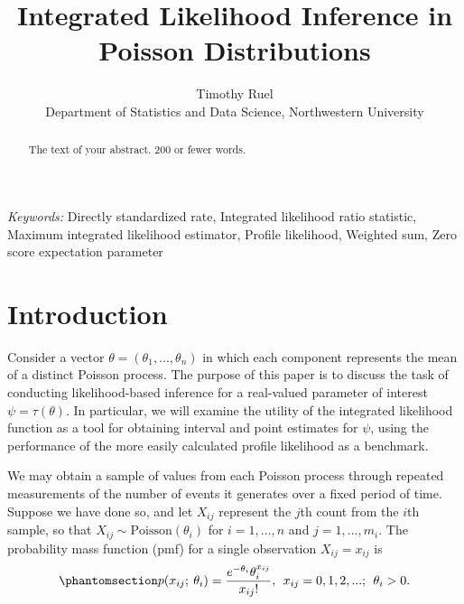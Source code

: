 \documentclass[
  12pt]{article}
\begin{document}
\def\spacingset#1{\renewcommand{\baselinestretch}%
{#1}\small\normalsize} \spacingset{1}



\title{\bf Integrated Likelihood Inference in Poisson Distributions}
\author{
Timothy Ruel\\
Department of Statistics and Data Science, Northwestern University\\
}
\maketitle

\bigskip
\bigskip
\begin{abstract}
The text of your abstract. 200 or fewer words.
\end{abstract}

\noindent%
{\it Keywords:} Directly standardized rate, Integrated likelihood ratio
statistic, Maximum integrated likelihood estimator, Profile
likelihood, Weighted sum, Zero score expectation parameter
\vfill

\newpage
\spacingset{1.9} %


\section{Introduction}\label{sec-intro}

Consider a vector \(\theta = (\theta_1, ..., \theta_n)\) in which each
component represents the mean of a distinct Poisson process. The purpose
of this paper is to discuss the task of conducting likelihood-based
inference for a real-valued parameter of interest
\(\psi = \tau(\theta)\). In particular, we will examine the utility of
the integrated likelihood function as a tool for obtaining interval and
point estimates for \(\psi\), using the performance of the more easily
calculated profile likelihood as a benchmark.

We may obtain a sample of values from each Poisson process through
repeated measurements of the number of events it generates over a fixed
period of time. Suppose we have done so, and let \(X_{ij}\) represent
the \(j\)th count from the \(i\)th sample, so that
\(X_{ij} \sim \text{Poisson}(\theta_i)\) for \(i = 1, ..., n\) and
\(j = 1, ..., m_i.\) The probability mass function (pmf) for a single
observation \(X_{ij} = x_{ij}\) is
\begin{equation}\phantomsection\label{eq-1-1}{
p(x_{ij}; \> \theta_i) = \frac{e^{-\theta_i} \theta_i ^ {x_{ij}}}{x_{ij}!}, \> \> x_{ij} = 0, 1, 2, ... ; \> \> \theta_i > 0.
}\end{equation}
\end{document}
